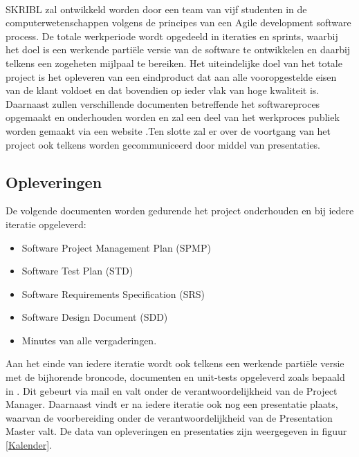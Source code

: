 \documentclass{article}
\begin{document}
\\
SKRIBL zal ontwikkeld worden door een team van vijf studenten in de computerwetenschappen volgens de principes van een Agile development software process. De totale werkperiode wordt opgedeeld in iteraties en sprints, waarbij het doel is een werkende parti\"{e}le versie van de software te ontwikkelen en daarbij telkens een zogeheten mijlpaal te bereiken. Het uiteindelijke doel van het totale project is het opleveren van een eindproduct dat aan alle vooropgestelde eisen van de klant voldoet en dat bovendien op ieder vlak van hoge kwaliteit is. Daarnaast zullen verschillende documenten betreffende het softwareproces opgemaakt en onderhouden worden en zal een deel van het werkproces publiek worden gemaakt via een website \citep{website:skribl} .Ten slotte zal er over de voortgang van het project ook telkens worden gecommuniceerd door middel van presentaties.


\subsection{Opleveringen}

De volgende documenten worden gedurende het project onderhouden en bij iedere iteratie opgeleverd:

\begin{itemize}
\item Software Project Management Plan (SPMP)
\item Software Test Plan (STD)
\item Software Requirements Specification (SRS)
\item Software Design Document (SDD)
\item Minutes van alle vergaderingen.
\end{itemize}

Aan het einde van iedere iteratie wordt ook telkens een werkende parti\"{e}le versie met de bijhorende broncode, documenten en unit-tests opgeleverd zoals bepaald in
\cite{Xtreport:organisatie}. Dit gebeurt via mail en valt onder de verantwoordelijkheid van de Project Manager. Daarnaast vindt er na iedere iteratie ook nog een presentatie plaats, waarvan de voorbereiding onder de verantwoordelijkheid van de Presentation Master valt. De data van opleveringen en presentaties zijn weergegeven in figuur \ref{Kalender}.
\end{document}

